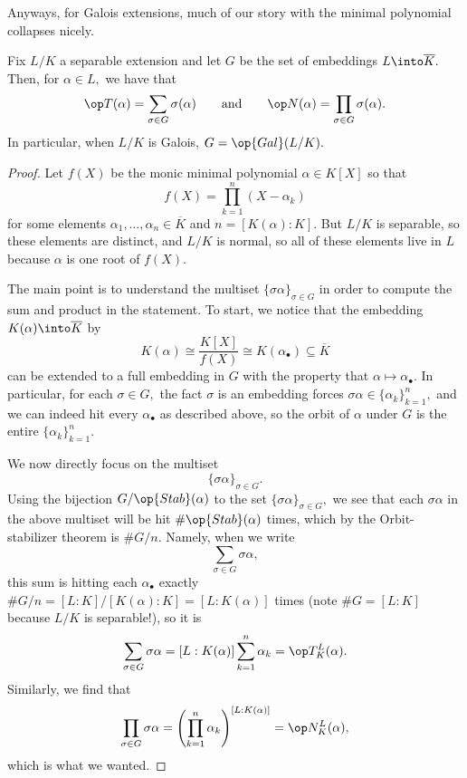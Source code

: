 \documentclass[../notes.tex]{subfiles}
\begin{document}
Anyways, for Galois extensions, much of our story with the minimal polynomial collapses nicely.
\begin{proposition} \label{lem:galoisnormtrace}
	Fix $L/K$ a separable extension and let $G$ be the set of embeddings $L\into\overline K.$ Then, for $\alpha\in L,$ we have that
	\[\op T(\alpha)=\sum_{\sigma\in G}\sigma(\alpha)\qquad\text{and}\qquad\op N(\alpha)=\prod_{\sigma\in G}\sigma(\alpha).\]
	In particular, when $L/K$ is Galois, $G=\op{Gal}(L/K).$
\end{proposition}
\begin{proof}
	Let $f(X)$ be the monic minimal polynomial $\alpha\in K[X]$ so that
	\[f(X)=\prod_{k=1}^n(X-\alpha_k)\]
	for some elements $\alpha_1,\ldots,\alpha_n\in\overline K$ and $n=[K(\alpha):K].$ But $L/K$ is separable, so these elements are distinct, and $L/K$ is normal, so all of these elements live in $L$ because $\alpha$ is one root of $f(X).$

	The main point is to understand the multiset $\{\sigma\alpha\}_{\sigma\in G}$ in order to compute the sum and product in the statement. To start, we notice that the embedding $K(\alpha)\into\overline K$ by
	\[K(\alpha)\cong\frac{K[X]}{f(X)}\cong K(\alpha_\bullet)\subseteq\overline K\]
	can be extended to a full embedding in $G$ with the property that $\alpha\mapsto\alpha_\bullet.$ In particular, for each $\sigma\in G,$ the fact $\sigma$ is an embedding forces $\sigma\alpha\in\{\alpha_k\}_{k=1}^n,$ and we can indeed hit every $\alpha_\bullet$ as described above, so the orbit of $\alpha$ under $G$ is the entire $\{\alpha_k\}_{k=1}^n.$

	We now directly focus on the multiset
	\[\{\sigma\alpha\}_{\sigma\in G}.\]
	Using the bijection $G/\op{Stab}(\alpha)$ to the set $\{\sigma\alpha\}_{\sigma\in G},$ we see that each $\sigma\alpha$ in the above multiset will be hit $\#\op{Stab}(\alpha)$ times, which by the Orbit-stabilizer theorem is $\#G/n.$ Namely, when we write
	\[\sum_{\sigma\in G}\sigma\alpha,\]
	this sum is hitting each $\alpha_\bullet$ exactly $\#G/n=[L:K]/[K(\alpha):K]=[L:K(\alpha)]$ times (note $\#G=[L:K]$ because $L/K$ is separable!), so it is
	\[\sum_{\sigma\in G}\sigma\alpha=[L:K(\alpha)]\sum_{k=1}^n\alpha_k=\op T^L_K(\alpha).\]
	Similarly, we find that
	\[\prod_{\sigma\in G}\sigma\alpha=\left(\prod_{k=1}^n\alpha_k\right)^{[L:K(\alpha)]}=\op N^L_K(\alpha),\]
	which is what we wanted.
\end{proof}
\end{document}

